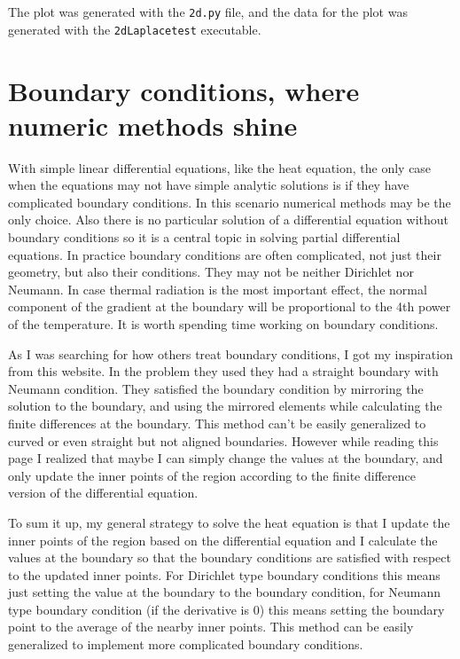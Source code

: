 \documentclass[pdftex,12pt,a4paper]{article}
\begin{document}
		The plot was generated with the \texttt{2d.py} file, and the data for the plot was generated with the \texttt{2dLaplacetest} executable.
	\section{Boundary conditions, where numeric methods shine}
		With simple linear differential equations, like the heat equation, the only case when the equations may not have simple analytic solutions is if they have complicated boundary conditions. In this scenario numerical methods may be the only choice. Also there is no particular solution of a differential equation without boundary conditions so it is a central topic in solving partial differential equations. In practice boundary conditions are often complicated, not just their geometry, but also their conditions. They may not be neither Dirichlet nor Neumann. In case thermal radiation is the most important effect, the normal component of the gradient at the boundary will be proportional to the 4th power of the temperature. It is worth spending time working on boundary conditions.
		
		As I was searching for how others treat boundary conditions, I got my inspiration from this website. \cite{lectureNotes} In the problem they used they had a straight boundary with Neumann condition. They satisfied the boundary condition by mirroring the solution to the boundary, and using the mirrored elements while calculating the finite differences at the boundary. This method can't be easily generalized to curved or even straight but not aligned boundaries. However while reading this page I realized that maybe I can simply change the values at the boundary, and only update the inner points of the region according to the finite difference version of the differential equation.
		
		To sum it up, my general strategy to solve the heat equation is that I update the inner points of the region based on the differential equation and I calculate the values at the boundary so that the boundary conditions are satisfied with respect to the updated inner points. For Dirichlet type boundary conditions this means just setting the value at the boundary to the boundary condition, for Neumann type boundary condition (if the derivative is 0) this means setting the boundary point to the average of the nearby inner points. This method can be easily generalized to implement more complicated boundary conditions.
		
\end{document}
